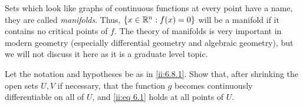 \begin{rmk}\label{ii:6.8.4}
  Sets which look like graphs of continuous functions at every point have a name, they are called \emph{manifolds}.
  Thus, \(\left\lbrace x \in \mathbb{R}^n : f(x) = 0\right\rbrace\) will be a manifold if it contains no critical points of \(f\).
  The theory of manifolds is very important in modern geometry (especially differential geometry and algebraic geometry), but we will not discuss it here as it is a graduate level topic.
\end{rmk}

\exercisesection

\begin{ex}\label{ii:ex:6.8.1}
  Let the notation and hypotheses be as in \cref{ii:6.8.1}.
  Show that, after shrinking the open sets \(U, V\) if necessary, that the function \(g\) becomes continuously differentiable on all of \(U\), and \cref{ii:eq 6.1} holds at all points of \(U\).
\end{ex}
